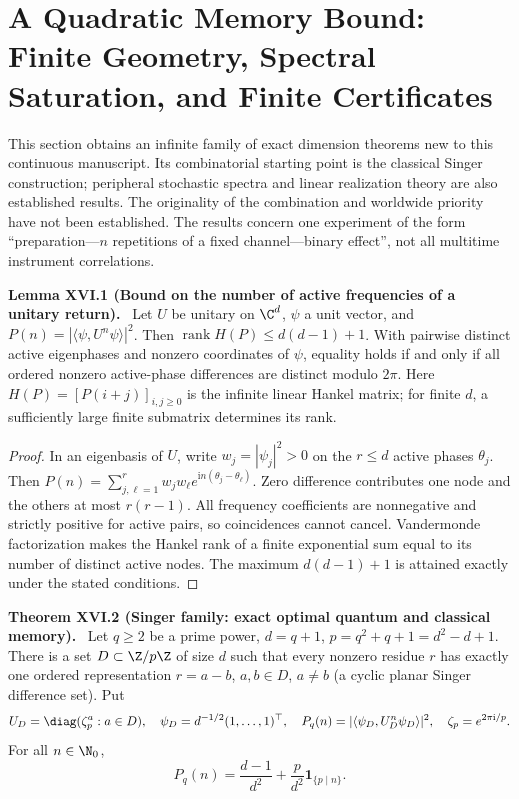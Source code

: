\documentclass[11pt,a4paper,oneside]{book}
\newcommand{\one}{\mathbf 1}\newcommand{\ii}{\mathrm i}\newcommand{\dd}{\mathrm d}
\DeclareMathOperator{\rank}{rank}\DeclareMathOperator{\Tr}{Tr}
\newcommand{\statement}[3]{\par\medskip\noindent\textbf{#1 #2 (#3).}\ }
\begin{document}
\chapter{A Quadratic Memory Bound: Finite Geometry, Spectral Saturation, and Finite Certificates}
This section obtains an infinite family of exact dimension theorems new to this continuous manuscript. Its combinatorial starting point is the classical Singer construction; peripheral stochastic spectra and linear realization theory are also established results. The originality of the combination and worldwide priority have not been established. The results concern one experiment of the form ``preparation---$n$ repetitions of a fixed channel---binary effect'', not all multitime instrument correlations.
\statement{Lemma}{XVI.1}{Bound on the number of active frequencies of a unitary return} Let $U$ be unitary on $\C^d$, $\psi$ a unit vector, and $P(n)=|\langle\psi,U^n\psi\rangle|^2$. Then $\rank H(P)\le d(d-1)+1$. With pairwise distinct active eigenphases and nonzero coordinates of $\psi$, equality holds if and only if all ordered nonzero active-phase differences are distinct modulo $2\pi$. Here $H(P)=[P(i+j)]_{i,j\ge0}$ is the infinite linear Hankel matrix; for finite $d$, a sufficiently large finite submatrix determines its rank.
\begin{proof}In an eigenbasis of $U$, write $w_j=|\psi_j|^2>0$ on the $r\le d$ active phases $\theta_j$. Then $P(n)=\sum_{j,\ell=1}^r w_jw_\ell e^{\ii n(\theta_j-\theta_\ell)}$. Zero difference contributes one node and the others at most $r(r-1)$. All frequency coefficients are nonnegative and strictly positive for active pairs, so coincidences cannot cancel. Vandermonde factorization makes the Hankel rank of a finite exponential sum equal to its number of distinct active nodes. The maximum $d(d-1)+1$ is attained exactly under the stated conditions.\end{proof}
\statement{Theorem}{XVI.2}{Singer family: exact optimal quantum and classical memory} Let $q\ge2$ be a prime power, $d=q+1$, $p=q^2+q+1=d^2-d+1$. There is a set $D\subset\Z/p\Z$ of size $d$ such that every nonzero residue $r$ has exactly one ordered representation $r=a-b$, $a,b\in D$, $a\ne b$ (a cyclic planar Singer difference set). Put
\[U_D=\diag(\zeta_p^a:a\in D),\quad\psi_D=d^{-1/2}(1,\ldots,1)^\top,\quad P_q(n)=|\langle\psi_D,U_D^n\psi_D\rangle|^2,\quad\zeta_p=e^{2\pi\ii/p}.\]
For all $n\in\N_0$,
\begin{equation}P_q(n)=\frac{d-1}{d^2}+\frac p{d^2}\one_{\{p\mid n\}}.\tag{69}\end{equation}
\end{document}
